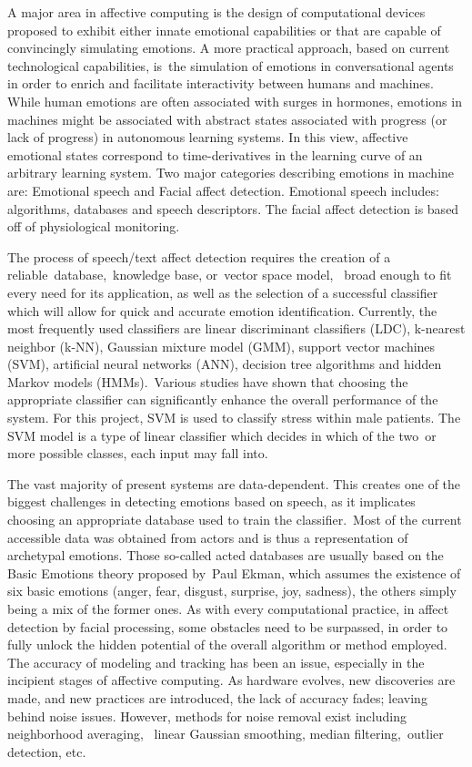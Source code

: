 A major area in affective computing is the design of computational devices proposed to exhibit either innate emotional capabilities 
or that are capable of convincingly simulating emotions. A more practical approach, based on current technological capabilities, 
is the simulation of emotions in conversational agents in order to enrich and facilitate interactivity between humans and machines. 
While human emotions are often associated with surges in hormones, emotions in machines might be associated with abstract states 
associated with progress (or lack of progress) in autonomous learning systems. In this view, affective emotional states correspond to 
time-derivatives in the learning curve of an arbitrary learning system. Two major categories describing emotions in machine are: 
Emotional speech and Facial affect detection. Emotional speech includes: algorithms, databases and speech descriptors. 
The facial affect detection is based off of physiological monitoring. 

The process of speech/text affect detection requires the creation of a reliable database, knowledge base, or vector space model, 
broad enough to fit every need for its application, as well as the selection of a successful classifier which will allow for quick and 
accurate emotion identification. Currently, the most frequently used classifiers are linear discriminant classifiers (LDC), 
k-nearest neighbor (k-NN), Gaussian mixture model (GMM), support vector machines (SVM), artificial neural networks (ANN), decision 
tree algorithms and hidden Markov models (HMMs). Various studies have shown that choosing the appropriate classifier can significantly 
enhance the overall performance of the system. For this project, SVM is used to classify stress within male patients. The SVM model is 
a type of linear classifier which decides in which of the two or more possible classes, each input may fall into.

The vast majority of present systems are data-dependent. This creates one of the biggest challenges in detecting emotions based on speech, 
as it implicates choosing an appropriate database used to train the classifier. Most of the current accessible data was obtained from actors 
and is thus a representation of archetypal emotions. Those so-called acted databases are usually based on the Basic Emotions theory proposed 
by Paul Ekman, which assumes the existence of six basic emotions (anger, fear, disgust, surprise, joy, sadness), the others simply being a mix 
of the former ones. As with every computational practice, in affect detection by facial processing, some obstacles need to be surpassed, 
in order to fully unlock the hidden potential of the overall algorithm or method employed. The accuracy of modeling and tracking has been 
an issue, especially in the incipient stages of affective computing. As hardware evolves, new discoveries are made, and new practices are 
introduced, the lack of accuracy fades; leaving behind noise issues. However, methods for noise removal exist including neighborhood averaging, 
linear Gaussian smoothing, median filtering, outlier detection, etc.

